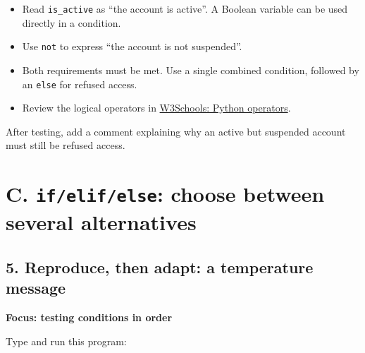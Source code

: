 \documentclass[12pt,a4paper]{article}
\begin{document}
\begin{itemize}
\item Read \texttt{is\_active} as “the account is active”. A Boolean variable can be used directly in a condition.
\item Use \texttt{not} to express “the account is not suspended”.
\item Both requirements must be met. Use a single combined condition, followed by an \texttt{else} for refused access.
\item Review the logical operators in \href{https://www.w3schools.com/python/python_operators.asp}{W3Schools: Python operators}.
\end{itemize}
After testing, add a comment explaining why an active but suspended account must still be refused access.

\section*{C. \texttt{if/elif/else}: choose between several alternatives}
\subsection*{5. Reproduce, then adapt: a temperature message}
\textbf{Focus: testing conditions in order}

Type and run this program:
\end{document}
